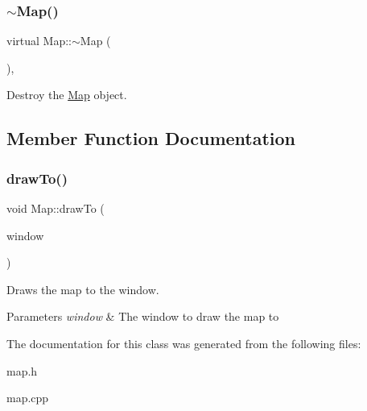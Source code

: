 \subsubsection{\texorpdfstring{$\sim$Map()}{~Map()}}
{\footnotesize\ttfamily virtual Map\+::$\sim$\+Map (\begin{DoxyParamCaption}{ }\end{DoxyParamCaption})\hspace{0.3cm}{\ttfamily [virtual]}, {\ttfamily [default]}}



Destroy the \mbox{\hyperlink{classMap}{Map}} object. 



\subsection{Member Function Documentation}
\mbox{\label{classMap_acbc620429ff8e8de0a62ad322581535f}} 
\subsubsection{\texorpdfstring{drawTo()}{drawTo()}}
{\footnotesize\ttfamily void Map\+::draw\+To (\begin{DoxyParamCaption}\item[{sf\+::\+Render\+Window \&}]{window }\end{DoxyParamCaption})\hspace{0.3cm}{\ttfamily [virtual]}}



Draws the map to the window. 


\begin{DoxyParams}{Parameters}
{\em window} & The window to draw the map to \\
\hline
\end{DoxyParams}


The documentation for this class was generated from the following files\+:\begin{DoxyCompactItemize}
\item 
map.\+h\item 
map.\+cpp\end{DoxyCompactItemize}
